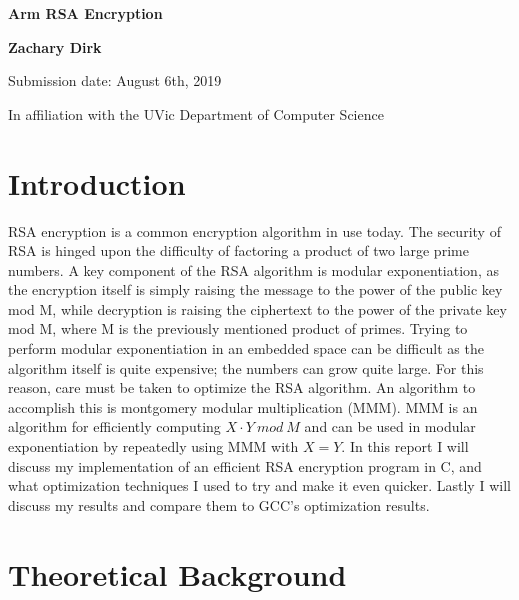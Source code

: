 \documentclass[12pt]{article}
\begin{document}
\begin{titlepage}
    \begin{center}
    
        \vspace*{1cm}
    
        \textbf{Arm RSA Encryption}
    
        \vspace{2.0cm}
    
        \textbf{Zachary Dirk}
        
        \vfill
    
        Submission date: August 6th, 2019

        In affiliation with the UVic Department of Computer Science
    
        \vspace{0.8cm}
        
    \end{center}
\end{titlepage}

\tableofcontents

\clearpage

\section{Introduction}

RSA encryption is a common encryption algorithm in use today. The security of RSA is hinged upon the difficulty of factoring a product of two large prime numbers. A key component of the RSA algorithm is modular exponentiation, as the encryption itself is simply raising the message to the power of the public key mod M, while decryption is raising the ciphertext to the power of the private key mod M, where M is the previously mentioned product of primes. Trying to perform modular exponentiation in an embedded space can be difficult as the algorithm itself is quite expensive; the numbers can grow quite large. For this reason, care must be taken to optimize the RSA algorithm. An algorithm to accomplish this is montgomery modular multiplication (MMM). MMM is an algorithm for efficiently computing $X \cdot Y\ mod\ M$ and can be used in modular exponentiation by repeatedly using MMM with $X = Y$. In this report I will discuss my implementation of an efficient RSA encryption program in C, and what optimization techniques I used to try and make it even quicker. Lastly I will discuss my results and compare them to GCC's optimization results.

\section{Theoretical Background}
\end{document}
